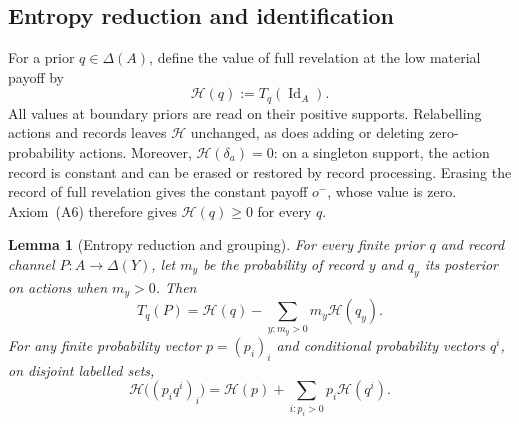 \documentclass[11pt,a4paper]{article}
\newtheorem{lemma}[theorem]{Lemma}
\theoremstyle{definition}
\newcommand{\D}{\Delta}
\newcommand{\Id}{\operatorname{Id}}
\newcommand{\1}{\mathbf 1}
\begin{document}
\subsection{Entropy reduction and identification}
\label{mf:sec:entropy}

For a prior $q\in\D(A)$, define the value of full revelation at the low
material payoff by
\[
 \mathcal H(q):=T_q(\Id_A).
\]
All values at boundary priors are read on their positive supports.  Relabelling
actions and records leaves $\mathcal H$ unchanged, as does adding or deleting
zero-probability actions.  Moreover, $\mathcal H(\delta_a)=0$: on a singleton
support, the action record is constant and can be erased or restored by
record processing.  Erasing the record of full revelation gives the constant
payoff $o^-$, whose value is zero.  Axiom~\textup{(A6)} therefore gives
$\mathcal H(q)\ge0$ for every $q$.

\begin{lemma}[Entropy reduction and grouping]
\label{mf:lem:entropy-reduction}
For every finite prior $q$ and record channel $P:A\to\D(Y)$, let $m_y$ be
the probability of record $y$ and $q_y$ its posterior on actions when $m_y>0$.
Then
\begin{equation}
 T_q(P)=\mathcal H(q)-\sum_{y:m_y>0}m_y\mathcal H(q_y).
 \label{mf:eq:entropy-reduction}
\end{equation}
For any finite probability vector $p=(p_i)_i$ and conditional probability
vectors $q^i$, on disjoint labelled sets,
\begin{equation}
 \mathcal H\bigl((p_iq^i)_i\bigr)
 =\mathcal H(p)+\sum_{i:p_i>0}p_i\mathcal H(q^i).
 \label{mf:eq:grouping}
\end{equation}
\end{lemma}
\end{document}
